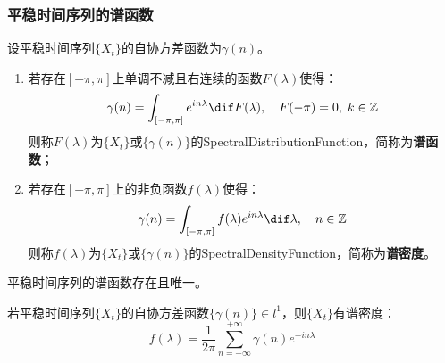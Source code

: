 \subsubsection{平稳时间序列的谱函数}
\begin{definition}
	设平稳时间序列$\{X_t\}$的自协方差函数为$\gamma(n)$。
	\begin{enumerate}
		\item 若存在$[-\pi,\pi]$上单调不减且右连续的函数$F(\lambda)$使得：
		\begin{equation*}
			\gamma(n)=\int_{[-\pi,\pi]}e^{in\lambda}\dif F(\lambda),\quad F(-\pi)=0,\;k\in\mathbb{Z}^{}
		\end{equation*}
		则称$F(\lambda)$为$\{X_t\}$或$\{\gamma(n)\}$的\gls{SpectralDistributionFunction}，简称为\textbf{谱函数}；
		\item 若存在$[-\pi,\pi]$上的非负函数$f(\lambda)$使得：
		\begin{equation*}
			\gamma(n)=\int_{[-\pi,\pi]}f(\lambda)e^{in\lambda}\dif\lambda,\quad n\in\mathbb{Z}^{}
		\end{equation*}
		则称$f(\lambda)$为$\{X_t\}$或$\{\gamma(n)\}$的\gls{SpectralDensityFunction}，简称为\textbf{谱密度}。
	\end{enumerate}
\end{definition}
\begin{theorem}
	平稳时间序列的谱函数存在且唯一。
\end{theorem}
\begin{theorem}\label{theo:SpectralGamma}
	若平稳时间序列$\{X_t\}$的自协方差函数$\{\gamma(n)\}\in l^1$，则$\{X_t\}$有谱密度：
	\begin{equation*}
		f(\lambda)=\frac{1}{2\pi}\sum_{n=-\infty}^{+\infty}\gamma(n)e^{-in\lambda}
	\end{equation*}
\end{theorem}
